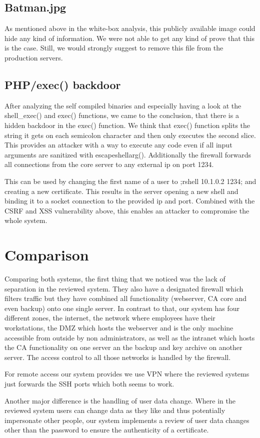 \documentclass{article}
\begin{document}
\subsection{Batman.jpg}
As mentioned above in the white-box analysis, this publicly available image could hide any kind of information. We were not able to get any kind of prove that this is the case. Still, we would strongly suggest to remove this file from the production servers.

\subsection{PHP/exec() backdoor}
After analyzing the self compiled binaries and especially having a look at the shell\_exec() and exec() functions, we came to the conclusion, that there is a hidden backdoor in the exec() function. We think that exec() function splits the string it gets on each semicolon character and then only executes the second slice. This provides an attacker with a way to execute any code even if all input arguments are sanitized with escapeshellarg(). Additionally the firewall forwards all connections from the core server to any external ip on port 1234.

This can be used by changing the first name of a user to ;rshell 10.1.0.2 1234; and creating a new certificate. This results in the server opening a new shell and binding it to a socket connection to the provided ip and port. Combined with the CSRF and XSS vulnerability above, this enables an attacker to compromise the whole system.

\section{Comparison}
Comparing both systems, the first thing that we noticed was the lack of separation in the reviewed system. They also have a designated firewall which filters traffic but they have combined all functionality (webserver, CA core and even backup) onto one single server. In contrast to that, our system has four different zones, the internet, the network where employees have their workstations, the DMZ which hosts the webserver and is the only machine accessible from outside by non administrators, as well as the intranet which hosts the CA functionality on one server an the backup and key archive on another server. The access control to all those networks is handled by the firewall.

For remote access our system provides we use VPN where the reviewed systems just forwards the SSH ports which both seems to work.

Another major difference is the handling of user data change. Where in the reviewed system users can change data as they like and thus potentially impersonate other people, our system implements a review of user data changes other than the password to ensure the authenticity of a certificate.
\end{document}

